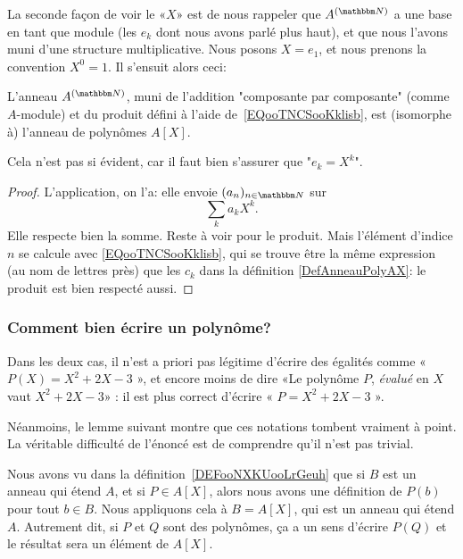 La seconde façon de voir le «\( X\)» est de nous rappeler que \( A^{(\eN)}\) a une base en tant que module (les \( e_k\) dont nous avons parlé plus haut), et que nous l'avons muni d'une structure multiplicative. Nous posons \( X=e_1\), et nous prenons la convention \( X^0=1\). Il s'ensuit alors ceci:

\begin{propositionDef}
  L'anneau \(A^{(\eN)}\), muni de l'addition "composante par composante" (comme \( A \)-module) et du produit défini à l'aide de~\eqref{EQooTNCSooKklisb}, est (isomorphe à) l'anneau de polynômes \( A[X]\).
\end{propositionDef}

Cela n'est pas si évident, car il faut bien s'assurer que "\( e_k=X^k\)".

\begin{proof}
  L'application, on l'a: elle envoie  \( (a_n)_{n\in \eN}\) sur 
\begin{equation}
    \sum_ka_kX^k.
\end{equation}
Elle respecte bien la somme. Reste à voir pour le produit. Mais l'élément d'indice \(n \) se calcule avec \eqref{EQooTNCSooKklisb}, qui se trouve être la même expression (au nom de lettres près) que les \( c_k \) dans la définition \ref{DefAnneauPolyAX}: le produit est bien respecté aussi.
\end{proof}


\subsubsection{Comment bien écrire un polynôme?}
\label{SUBSUBSEC_bienEcrireUnPoly}
Dans les deux cas, il n'est a priori pas légitime d'écrire des égalités comme « \( P(X)=X^2+2X-3\) », et encore moins de dire «Le polynôme \( P\), \emph{évalué} en \( X\) vaut \( X^2+2X-3\)»  : il est plus correct d'écrire « \( P=X^2+2X-3\) ».

Néanmoins, le lemme suivant montre que ces notations tombent vraiment à point. La véritable difficulté de l'énoncé est de comprendre qu'il n'est pas trivial.

Nous avons vu dans la définition~\ref{DEFooNXKUooLrGeuh} que si \( B\) est un anneau qui étend \( A\), et si \(P\in A[X] \), alors nous avons une définition de \( P(b)\) pour tout \( b\in B\). Nous appliquons cela à \( B=A[X]\), qui est un anneau qui étend \( A\). Autrement dit, si \( P\) et \( Q\) sont des polynômes, ça a un sens d'écrire \( P(Q)\) et le résultat sera un élément de \( A[X]\). 

